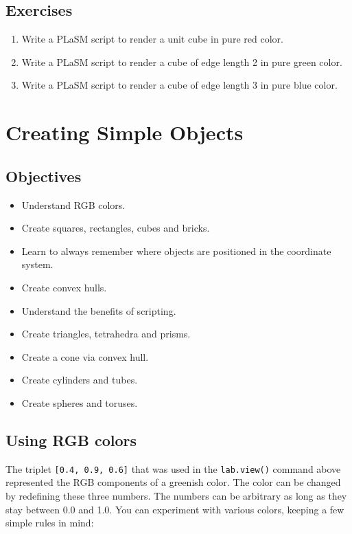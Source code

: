 \documentclass{article}
\begin{document}
\subsection{Exercises}

\begin{enumerate}
\item Write a PLaSM script to render a unit cube in pure red color.
\item Write a PLaSM script to render a cube of edge length 2 in pure green color.
\item Write a PLaSM script to render a cube of edge length 3 in pure blue color.
\end{enumerate}

\newpage
\section{Creating Simple Objects}

\subsection{Objectives}
\begin{itemize}
\item Understand RGB colors.
\item Create squares, rectangles, cubes and bricks.
\item Learn to always remember where objects are positioned in the coordinate system.
\item Create convex hulls.
\item Understand the benefits of scripting.
\item Create triangles, tetrahedra and prisms.
\item Create a cone via convex hull.
\item Create cylinders and tubes.
\item Create spheres and toruses.
\end{itemize}


\subsection{Using RGB colors} \label{subsec:colors}

The triplet {\tt [0.4, 0.9, 0.6]} that was used in the {\tt lab.view()} command
above represented the RGB components of a greenish color. The color can be changed 
by redefining these three numbers. The numbers can be arbitrary as long as they stay 
between 0.0 and 1.0. You can experiment with various colors, keeping a few 
simple rules in mind:
\end{document}
